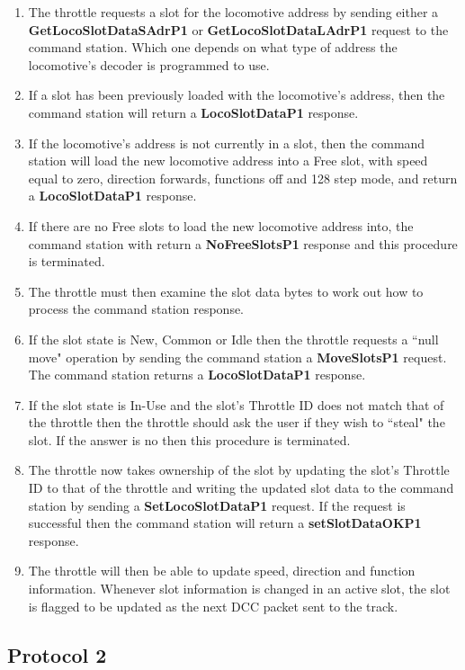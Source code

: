 \begin{enumerate}
\item The throttle requests a slot for the locomotive \gls{address} by sending either a \textbf{GetLocoSlotDataSAdrP1} or \textbf{GetLocoSlotDataLAdrP1} request to the command station. Which one depends on what type of address the locomotive's decoder is programmed to use. 
\item If a slot has been previously loaded with the locomotive's address, then the command station will return a \textbf{LocoSlotDataP1} response.
\item If the locomotive's address is not currently in a slot, then the command station will load the new locomotive address into a Free slot, with speed equal to zero, direction forwards, functions off and 128 step mode, and return a \textbf{LocoSlotDataP1} response.
\item If there are no Free slots to load the new locomotive address into, the command station with return a \textbf{NoFreeSlotsP1} response and this procedure is terminated.
\item The throttle must then examine the slot data bytes to work out how to process the command station response.
\item If the slot state is New, Common or Idle then the throttle requests a ``null move" operation by sending the command station a \textbf{MoveSlotsP1} request. The command station returns a \textbf{LocoSlotDataP1} response. 
\item If the slot state is In-Use and the slot's \gls{Throttle ID} does not match that of the throttle then the throttle should ask the user if they wish to ``steal" the slot. If the answer is no then this procedure is terminated.
\item The throttle now takes ownership of the slot by updating the slot's Throttle ID to that of the throttle and writing the updated slot data to the command station by sending a \textbf{SetLocoSlotDataP1} request. If the request is successful then the command station will return a \textbf{setSlotDataOKP1} response.
\item The throttle will then be able to update speed, direction and function information. Whenever slot information is changed in an active slot, the slot is flagged to be updated as the next DCC packet sent to the track.
\end{enumerate}

\subsection{Protocol 2}

